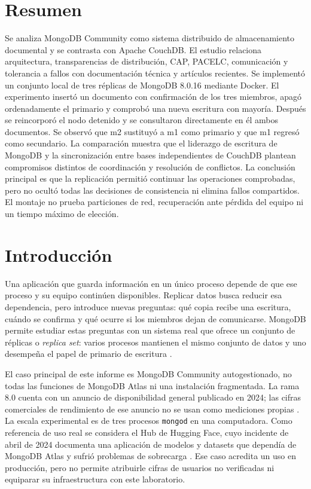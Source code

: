 \section*{Resumen}
Se analiza MongoDB Community como sistema distribuido de almacenamiento documental y se contrasta con Apache CouchDB. El estudio relaciona arquitectura, transparencias de distribución, CAP, PACELC, comunicación y tolerancia a fallos con documentación técnica y artículos recientes. Se implementó un conjunto local de tres réplicas de MongoDB 8.0.16 mediante Docker. El experimento insertó un documento con confirmación de los tres miembros, apagó ordenadamente el primario y comprobó una nueva escritura con mayoría. Después se reincorporó el nodo detenido y se consultaron directamente en él ambos documentos. Se observó que m2 sustituyó a m1 como primario y que m1 regresó como secundario. La comparación muestra que el liderazgo de escritura de MongoDB y la sincronización entre bases independientes de CouchDB plantean compromisos distintos de coordinación y resolución de conflictos. La conclusión principal es que la replicación permitió continuar las operaciones comprobadas, pero no ocultó todas las decisiones de consistencia ni elimina fallos compartidos. El montaje no prueba particiones de red, recuperación ante pérdida del equipo ni un tiempo máximo de elección.

\section{Introducción}
Una aplicación que guarda información en un único proceso depende de que ese proceso y su equipo continúen disponibles. Replicar datos busca reducir esa dependencia, pero introduce nuevas preguntas: qué copia recibe una escritura, cuándo se confirma y qué ocurre si los miembros dejan de comunicarse. MongoDB permite estudiar estas preguntas con un sistema real que ofrece un conjunto de réplicas o \textit{replica set}: varios procesos mantienen el mismo conjunto de datos y uno desempeña el papel de primario de escritura \cite{MongoReplication}.

El caso principal de este informe es MongoDB Community autogestionado, no todas las funciones de MongoDB Atlas ni una instalación fragmentada. La rama 8.0 cuenta con un anuncio de disponibilidad general publicado en 2024; las cifras comerciales de rendimiento de ese anuncio no se usan como mediciones propias \cite{scharf2024mongodb80}. La escala experimental es de tres procesos \texttt{mongod} en una computadora. Como referencia de uso real se considera el Hub de Hugging Face, cuyo incidente de abril de 2024 documenta una aplicación de modelos y datasets que dependía de MongoDB Atlas y sufrió problemas de sobrecarga \cite{Georges2024}. Ese caso acredita un uso en producción, pero no permite atribuirle cifras de usuarios no verificadas ni equiparar su infraestructura con este laboratorio.

